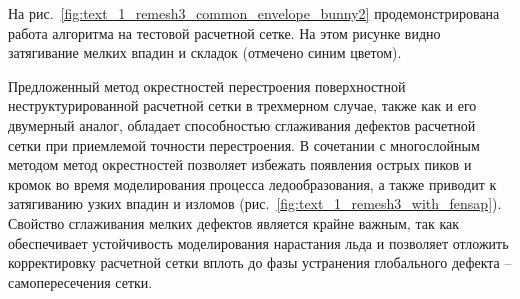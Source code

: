 На рис.~\ref{fig:text_1_remesh3_common_envelope_bunny2} продемонстрирована работа алгоритма на тестовой расчетной сетке.
На этом рисунке видно затягивание мелких впадин и складок (отмечено синим цветом).

Предложенный метод окрестностей перестроения поверхностной неструктурированной расчетной сетки в трехмерном случае, также как и его двумерный аналог, обладает способностью сглаживания дефектов расчетной сетки при приемлемой точности перестроения.
В сочетании с многослойным методом метод окрестностей позволяет избежать появления острых пиков и кромок во время моделирования процесса ледообразования, а также приводит к затягиванию узких впадин и изломов (рис.~\ref{fig:text_1_remesh3_with_fensap}).
Свойство сглаживания мелких дефектов является крайне важным, так как обеспечивает устойчивость моделирования нарастания льда и позволяет отложить корректировку расчетной сетки вплоть до фазы устранения глобального дефекта -- самопересечения сетки.

